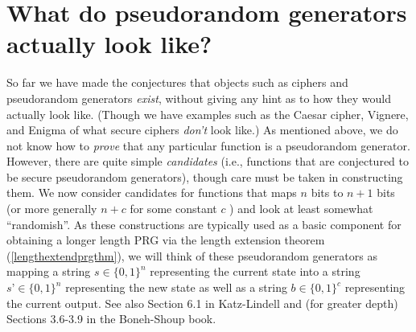 \hypertarget{cointossingphonerm}{}

\section{What do pseudorandom generators actually look
like?}\label{What-do-pseudorandom-generator}

So far we have made the conjectures that objects such as ciphers and
pseudorandom generators \emph{exist}, without giving any hint as to how
they would actually look like. (Though we have examples such as the
Caesar cipher, Vignere, and Enigma of what secure ciphers \emph{don't}
look like.) As mentioned above, we do not know how to \emph{prove} that
any particular function is a pseudorandom generator. However, there are
quite simple \emph{candidates} (i.e., functions that are conjectured to
be secure pseudorandom generators), though care must be taken in
constructing them. We now consider candidates for functions that maps
\(n\) bits to \(n+1\) bits (or more generally \(n+c\) for some constant
\(c\) ) and look at least somewhat ``randomish''. As these constructions
are typically used as a basic component for obtaining a longer length
PRG via the length extension theorem (\cref{lengthextendprgthm}), we
will think of these pseudorandom generators as mapping a string
\(s\in\{0,1\}^n\) representing the current state into a string
\(s’\in\{0,1\}^n\) representing the new state as well as a string
\(b\in\{0,1\}^c\) representing the current output. See also Section 6.1
in Katz-Lindell and (for greater depth) Sections 3.6-3.9 in the
Boneh-Shoup book.

